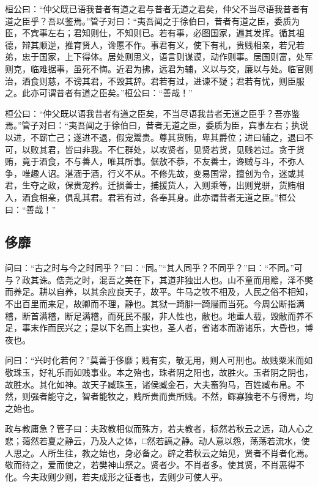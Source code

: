 \documentclass[]{article}
\begin{document}
桓公曰：``仲父既已语我昔者有道之君与昔者无道之君矣，仲父不当尽语我昔者有道之臣乎？吾以鉴焉。''管子对曰：``夷吾闻之于徐伯曰，昔者有道之臣，委质为臣，不宾事左右；君知则仕，不知则已。若有事，必图国家，遍其发挥。循其祖德，辩其顺逆，推育贤人，谗慝不作。事君有义，使下有礼，贵贱相亲，若兄若弟，忠于国家，上下得体。居处则思义，语言则谋谟，动作则事。居国则富，处军则克，临难据事，虽死不悔。近君为拂，远君为辅，义以与交，廉以与处。临官则治，酒食则慈，不谤其君，不毁其辞。君若有过，进谏不疑；君若有忧，则臣服之。此亦可谓昔者有道之臣矣。''桓公曰：``善哉！''

桓公曰：``仲父既以语我昔者有道之臣矣，不当尽语我昔者无道之臣乎？吾亦鉴焉。''管子对曰：``夷吾闻之于徐伯曰，昔者无道之臣，委质为臣，宾事左右；执说以进，不蕲亡己；遂进不退，假宠鬻贵。尊其货贿，卑其爵位；进曰辅之，退曰不可，以败其君，皆曰非我。不仁群处，以攻贤者，见贤若货，见贱若过。贪于货贿，竟于酒食，不与善人，唯其所事。倨敖不恭，不友善士，谗贼与斗，不弥人争，唯趣人诏。湛湎于酒，行义不从。不修先故，变易国常，擅创为令，迷或其君，生夺之政，保贵宠矜。迁损善士，捕援货人，入则乘等，出则党骈，货贿相入，酒食相亲，俱乱其君。君若有过，各奉其身。此亦谓昔者无道之臣。''桓公曰：``善哉！''

\hypertarget{header-n458}{%
\subsection{侈靡}\label{header-n458}}

问曰：``古之时与今之时同乎？''曰：``同。''``其人同乎？不同乎？''曰：``不同。''可与？政其诛。俈尧之时，混吾之美在下，其道非独出人也。山不童而用赡，泽不獘而养足。耕以自养，以其余应良天子，故平。牛马之牧不相及，人民之俗不相知，不出百里而来足，故卿而不理，静也。其狱一踦腓一踦屦而当死。今周公断指满稽，断首满稽，断足满稽，而死民不服，非人性也，敝也。地重人载，毁敝而养不足，事末作而民兴之；是以下名而上实也，圣人者，省诸本而游诸乐，大昏也，博夜也。

问曰：``兴时化若何？''莫善于侈靡；贱有实，敬无用，则人可刑也。故贱粟米而如敬珠玉，好礼乐而如贱事业。本之殆也，珠者阴之阳也，故胜火。玉者阴之阴也，故胜水。其化如神。故天子臧珠玉，诸侯臧金石，大夫畜狗马，百姓臧布帛。不然，则强者能守之，智者能牧之，贱所贵而贵所贱。不然，鳏寡独老不与得焉，均之始也。

政与教庸急？管子曰：夫政教相似而殊方，若夫教者，标然若秋云之远，动人心之悲；蔼然若夏之静云，乃及人之体，□然若謞之静。动人意以怨，荡荡若流水，使人思之。人所生往，教之始也，身必备之。辟之若秋云之始见，贤者不肖者化焉。敬而待之，爱而使之，若樊神山祭之。贤者少。不肖者多。使其贤，不肖恶得不化。今夫政则少则，若夫成形之征者也，去则少可使人乎。
\end{document}
